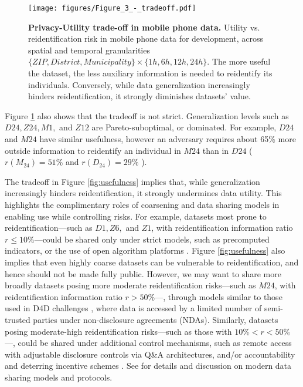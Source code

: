 \documentclass[12pt]{article}
\begin{document}
\begin{figure}[h!]
\centering
\texttt{[image: figures/Figure\_3\_-\_tradeoff.pdf]}
\caption{\textbf{Privacy-Utility trade-off in mobile phone data.} Utility vs. reidentification risk in mobile phone data for development, across spatial and temporal granularities $\{ ZIP, District, Municipality\}\times\{ 1h, 6h, 12h, 24h\}$. The more useful the dataset, the less auxiliary information is needed to reidentify its individuals. Conversely, while data  generalization increasingly hinders reidentification, it strongly diminishes datasets' value.}
\label{fig:tradeoff}
\end{figure}

Figure \ref{fig:tradeoff} also shows that the tradeoff is not strict. Generalization levels such as $D24, Z24, M1,$ and $Z12$ are Pareto-suboptimal, or dominated. For example, $D24$ and $M24$ have similar usefulness, however an adversary requires about 65\% more outside information to reidentify an individual in $M24$ than in $D24$ \big( $r(M_{24}) = 51\%$ and $r(D_{24}) = 29\%$  \big). 

The tradeoff in Figure \ref{fig:usefulness} implies that, while generalization increasingly hinders reidentification, it strongly undermines data utility. This highlights the complimentary roles of coarsening and data sharing models in enabling use while controlling risks. For example, datasets most prone to reidentification---such as $D1, Z6,$ and $Z1$, with reidentification information ratio $r \leq 10\%$---could be shared only under strict models, such as precomputed indicators, or the use of open algorithm platforms \cite{hardjono2016trust,opalwebsite}. Figure \ref{fig:usefulness} also implies that even highly coarse datasets can be vulnerable to reidentification, and hence should not be made fully public. However, we may want to share more broadly datasets posing more moderate reidentification risks---such as $M24$, with reidentification information ratio $r > 50\%$---, through models similar to those used in D4D challenges \cite{de2014d4d}, where data is accessed by a limited number of semi-trusted parties under non-disclosure agreements (NDAs). Similarly, datasets posing moderate-high reidentification risks---such as those with $10\% < r < 50\%$---, could be shared under additional control mechanisms, such as remote access with adjustable disclosure controls via Q\&A architectures, and/or accountability and deterring incentive schemes \cite{wan2015game}. See \cite{d2015privacy,yves17} for details and discussion on modern data sharing models and protocols.
\end{document}
